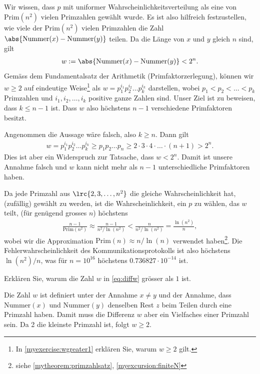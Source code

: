 \begin{aenum}
	Wir wissen, dass $p$ mit uniformer Wahrscheinlichkeitsverteilung als eine von $\text{Prim}(n^2)$ vielen Primzahlen gewählt wurde. Es ist also hilfreich festzustellen, wie viele der $\text{Prim}(n^2)$ vielen Primzahlen die Zahl $\abs{\text{Nummer}(x)-\text{Nummer}(y)}$ teilen. Da die Länge von $x$ und $y$ gleich $n$ sind, gilt
	\begin{align}\label{eq:diffw}
		w := \abs{\text{Nummer}(x)-\text{Nummer}(y)} < 2^n.
	\end{align}
	Gemäss dem Fundamentalsatz der Arithmetik (Primfaktorzerlegung), können wir $w\geq 2$ auf eindeutige Weise\footnote{In \cref{myexercise:wgreater1} erklären Sie, warum $w\geq 2$ gilt.} als $w = p_1^{i_1}p_2^{i_2}\ldots p_k^{i_k}$ darstellen, wobei $p_1<p_2<\ldots<p_k$ Primzahlen  und $i_1, i_2,\ldots ,i_k$ positive ganze Zahlen sind. Unser Ziel ist zu beweisen, dass $k\leq n-1$ ist. Dass $w$ also höchstens $n-1$ verschiedene Primfaktoren besitzt.
	\begin{myproof}
		Angenommen die Aussage wäre falsch, also $k\geq n$. Dann gilt
		\begin{align*}
			w
			= p_1^{i_1}p_2^{i_2}\ldots p_k^{i_k}
			\geq p_1p_2\ldots p_n
			\geq 2\cdot3\cdot4\cdot\ldots\cdot(n+1)
			> 2^n.
		\end{align*}
		Dies ist aber ein Widerspruch zur Tatsache, dass $w<2^n$.
		Damit ist unsere Annahme falsch und $w$ kann nicht mehr als $n-1$
		unterschiedliche Primfaktoren haben.
	\end{myproof}
	Da jede Primzahl aus $\lrc{2,3,\ldots ,n^2}$ die gleiche Wahrscheinlichkeit hat, (zufällig) gewählt zu werden, ist die Wahrscheinlichkeit, ein $p$ zu wählen, das $w$ teilt, (für genügend grosses $n$) höchstens
	\begin{align*}
		\frac{n-1}{\text{Prim}(n^2)}\approx \frac{n-1}{n^2/\ln(n^2)} < \frac{n}{n^2/\ln(n^2)} = \frac{\ln(n^2)}{n},
	\end{align*}
	wobei wir die Approximation $\text{Prim}(n)\approx n/\ln(n)$ verwendet haben\footnote{siehe \cref{mytheorem:primzahlsatz}, \cref{myexcursion:finiteN}}. Die Fehlerwahrscheinlichkeit des Kommunikationsprotokolls ist also höchstens $\ln(n^2)/n$, was für $n=10^{16}$ höchstens $0.736827\cdot 10^{-14}$ ist.
\end{aenum}
\begin{myexercise}\label{myexercise:wgreater1}
	Erklären Sie, warum die Zahl $w$ in \cref{eq:diffw} grösser als $1$ ist.
	\begin{myanswer}
		Die Zahl $w$ ist definiert unter der Annahme $x\neq y$ und der Annahme, dass $\text{Nummer}(x)$ und $\text{Nummer}(y)$ denselben Rest $z$ beim Teilen durch eine Primzahl haben. Damit muss die Differenz $w$ aber ein Vielfaches einer Primzahl sein. Da 2 die kleinste Primzahl ist, folgt $w\geq 2$.
	\end{myanswer}
\end{myexercise}

